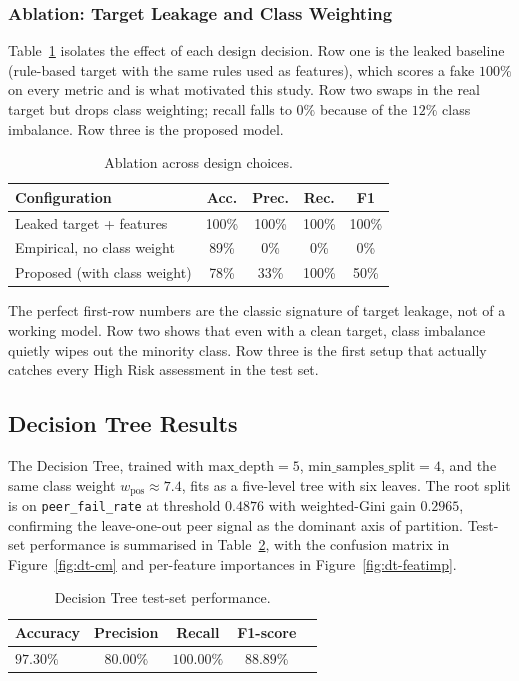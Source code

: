 \documentclass[conference]{IEEEtran}
\begin{document}
\subsubsection{Ablation: Target Leakage and Class Weighting}
Table~\ref{tab:ablation} isolates the effect of each design decision. Row one is the leaked baseline (rule-based target with the same rules used as features), which scores a fake $100\%$ on every metric and is what motivated this study. Row two swaps in the real target but drops class weighting; recall falls to $0\%$ because of the $12\%$ class imbalance. Row three is the proposed model.

\begin{table}[!t]
\caption{Ablation across design choices.}
\label{tab:ablation}
\centering
\small
\setlength{\tabcolsep}{4pt}
\begin{tabular}{p{3.6cm}cccc}
\toprule
Configuration & Acc. & Prec. & Rec. & F1 \\
\midrule
Leaked target + features & 100\% & 100\% & 100\% & 100\% \\
Empirical, no class weight & 89\% & 0\% & 0\% & 0\% \\
Proposed (with class weight) & 78\% & 33\% & 100\% & 50\% \\
\bottomrule
\end{tabular}
\end{table}

The perfect first-row numbers are the classic signature of target leakage, not of a working model. Row two shows that even with a clean target, class imbalance quietly wipes out the minority class. Row three is the first setup that actually catches every High Risk assessment in the test set.

\subsection{Decision Tree Results}
\label{sec:results-dt}
The Decision Tree, trained with $\mathrm{max\_depth}=5$, $\mathrm{min\_samples\_split}=4$, and the same class weight $w_{\mathrm{pos}} \approx 7.4$, fits as a five-level tree with six leaves. The root split is on \texttt{peer\_fail\_rate} at threshold $0.4876$ with weighted-Gini gain $0.2965$, confirming the leave-one-out peer signal as the dominant axis of partition. Test-set performance is summarised in Table~\ref{tab:dt-metrics}, with the confusion matrix in Figure~\ref{fig:dt-cm} and per-feature importances in Figure~\ref{fig:dt-featimp}.

\begin{table}[!t]
\caption{Decision Tree test-set performance.}
\label{tab:dt-metrics}
\centering
\begin{tabular}{lcccc}
\toprule
Accuracy & Precision & Recall & F1-score \\
\midrule
$97.30\%$ & $80.00\%$ & $100.00\%$ & $88.89\%$ \\
\bottomrule
\end{tabular}
\end{table}
\end{document}
